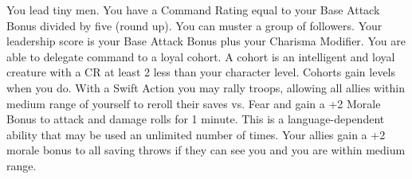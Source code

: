 \combatfeat
{You lead tiny men.}
{You have a Command Rating equal to your Base Attack Bonus divided by five (round up).}
{You can muster a group of followers. Your leadership score is your Base Attack Bonus plus your Charisma Modifier.}
{You are able to delegate command to a loyal cohort. A cohort is an intelligent and loyal creature with a CR at least 2 less than your character level. Cohorts gain levels when you do.}
{With a Swift Action you may rally troops, allowing all allies within medium range of yourself to reroll their saves vs. Fear and gain a +2 Morale Bonus to attack and damage rolls for 1 minute. This is a language-dependent ability that may be used an unlimited number of times.}
{Your allies gain a +2 morale bonus to all saving throws if they can see you and you are within medium range.}